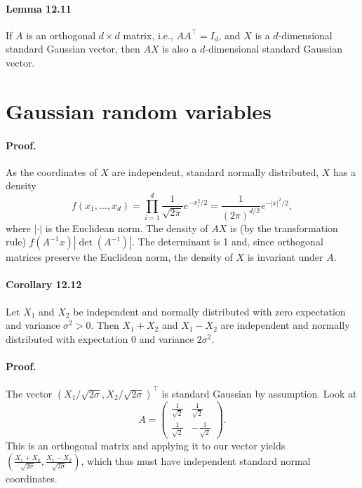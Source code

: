 \documentclass{article}
\begin{document}
\paragraph{Lemma 12.11} If $A$ is an orthogonal $d \times d$ matrix, i.e., $AA^\top = I_d$, and $X$ is a $d$-dimensional standard Gaussian vector, then $AX$ is also a $d$-dimensional standard Gaussian vector.





\section*{Gaussian random variables}

\paragraph{Proof.} As the coordinates of $X$ are independent, standard normally distributed, $X$ has a density
\[
f(x_1, \ldots, x_d) = \prod_{i=1}^{d} \frac{1}{\sqrt{2\pi}} e^{-x_i^2/2} = \frac{1}{(2\pi)^{d/2}} e^{-|x|^2/2},
\]
where $| \cdot |$ is the Euclidean norm. The density of $AX$ is (by the transformation rule) $f(A^{-1}x) |\det(A^{-1})|$. The determinant is 1 and, since orthogonal matrices preserve the Euclidean norm, the density of $X$ is invariant under $A$.

\paragraph{Corollary 12.12} Let $X_1$ and $X_2$ be independent and normally distributed with zero expectation and variance $\sigma^2 > 0$. Then $X_1 + X_2$ and $X_1 - X_2$ are independent and normally distributed with expectation 0 and variance $2\sigma^2$.

\paragraph{Proof.} The vector $(X_1/\sqrt{2\sigma}, X_2/\sqrt{2\sigma})^\top$ is standard Gaussian by assumption. Look at
\[
A = \begin{pmatrix} \frac{1}{\sqrt{2}} & \frac{1}{\sqrt{2}} \\ \frac{1}{\sqrt{2}} & -\frac{1}{\sqrt{2}} \end{pmatrix}.
\]
This is an orthogonal matrix and applying it to our vector yields $\left(\frac{X_1 + X_2}{\sqrt{2\sigma}}, \frac{X_1 - X_2}{\sqrt{2\sigma}}\right)$, which thus must have independent standard normal coordinates.
\end{document}
